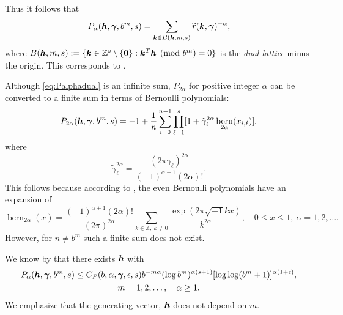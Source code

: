 \documentclass[authoryear]{elsarticle}
\newcommand{\tr}{\widetilde{r}}
\DeclareMathOperator{\Bern}{bern}
\begin{document}
Thus it follows that
\begin{equation} \label{eq:Palphadual}
    P_\alpha(\vh,\vgamma,b^m,s) = \sum_{\vk \in B(\vh,m,s)} \tr(\vk,\vgamma)^{-\alpha},
\end{equation}
where $B(\boldsymbol{h},m,s) : = \{\boldsymbol{k} \in  \mathbb{Z}^s \setminus \{\boldsymbol{0}\} : \boldsymbol{k}^T \boldsymbol{h} \pmod{b^m} = 0\}$ is the \emph{dual lattice} minus the origin.  This corresponds to \cite[(3)]{HicNie03a}.  

Although \eqref{eq:Palphadual} is an infinite sum, $P_{2\alpha}$ for positive integer $\alpha$ can be converted to a finite sum in terms of Bernoulli polynomials:
\begin{equation} \label{eq:P2alpha}
P_{2\alpha}(\vh,\vgamma,b^m,s) = -1 + \frac{1}{n}\sum_{i = 0}^{n-1}  
\prod_{\ell = 1}^s [1 + \tilde{\gamma}_{\ell}^{2\alpha}\Bern_{2\alpha}(x_{i,\ell})],
\end{equation}
where 
\begin{equation}  \label{eq:gammatilde}
    \tilde{\gamma}_{\ell}^{2\alpha} = \frac{(2\pi\gamma_{\ell} )^{2\alpha}}{(-1)^{\alpha +1}(2\alpha)!}.
\end{equation}
This follows because according to \cite[Equation 24.8.3]{OlvEtal10a}, the even Bernoulli polynomials have an expansion of 
\[
\Bern_{2\alpha}(x) = \frac{(-1)^{\alpha+1} (2\alpha)!}{(2 \pi)^{2\alpha}} \sum_{k \in \mathbb{Z}, \ k \ne 0} \frac{\exp(2\pi\sqrt{-1} k x)}{k^{2\alpha}}, \quad 0 \le x \le 1, \ \alpha = 1, 2, \ldots.
\]
However, for $n \ne b^m$ such a finite sum does not exist.

We know by \cite[Theorem 5]{HicNie03a} that  there exists $\boldsymbol{h}$ with
\begin{multline} \label{eq:Niedbd}
    P_{\alpha}(\boldsymbol{h},\boldsymbol{\gamma},b^m,s) \le C_{P}(b,\alpha,\boldsymbol{\gamma},\epsilon,s)
    b^{-m\alpha} (\log b^{m})^{\alpha(s+1)} [\log \log (
    b^m+1)]^{\alpha(1+\epsilon)}, \\ m = 1, 2,\ldots, \quad \alpha \ge 1.
\end{multline}
We emphasize that the generating vector, $\boldsymbol{h}$ does not depend on $m$.
\end{document}

